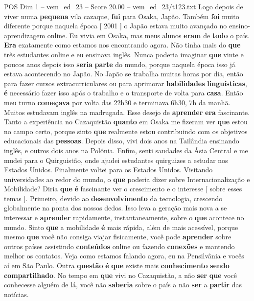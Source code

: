 \begin{textsample}{POS Dim 1 – vem\_ed\_23 – Score 20.00 – vem\_ed\_23/t123.txt}
Logo depois de viver numa \textbf{pequena} vila cazaque, \textbf{fui} para Osaka, Japão.
Também \textbf{foi} muito diferente porque naquela época [ 2001 ] o Japão estava muito avançado no ensino-aprendizagem online.
Eu vivia em Osaka, mas meus alunos \textbf{eram} de \textbf{todo} o país. \textbf{Era} exatamente como estamos nos encontrando agora.
Não tinha mais do \textbf{que} três estudantes online e eu ensinava inglês.
Nunca poderia imaginar \textbf{que} vinte e poucos anos depois isso \textbf{seria} \textbf{parte} do mundo, porque naquela época isso já estava acontecendo no Japão.
No Japão se trabalha muitas horas por dia, então para fazer cursos extracurriculares ou para aprimorar \textbf{habilidades} \textbf{linguísticas}, \textbf{é} necessário fazer isso após o trabalho e o transporte de volta para \textbf{casa}.
Então meu turno \textbf{começava} por volta das 22h30 e terminava 6h30, 7h da manhã.
Muitos estudavam inglês na madrugada.
Esse desejo de \textbf{aprender} \textbf{era} fascinante.
Tanto a experiência no Cazaquistão \textbf{quanto} em Osaka me fizeram ver \textbf{que} estou no campo certo, porque sinto \textbf{que} realmente estou contribuindo com os objetivos educacionais das \textbf{pessoas}.
Depois disso, vivi dois anos na Tailândia ensinando inglês, e outros dois anos na Polônia.
Enfim, senti saudades da Ásia Central e me mudei para o Quirguistão, onde ajudei estudantes quirguizes a estudar nos Estados Unidos.
Finalmente voltei para os Estados Unidos.
Visitando universidades ao redor do mundo, o \textbf{que} poderia dizer sobre Internacionalização e Mobilidade?
Diria \textbf{que} \textbf{é} fascinante ver o crescimento e o interesse [ sobre esses temas ].
Primeiro, devido ao \textbf{desenvolvimento} da tecnologia, crescendo globalmente na ponta dos nossos dedos.
Isso leva a geração mais nova a se interessar e \textbf{aprender} rapidamente, instantaneamente, sobre o \textbf{que} acontece no mundo.
Sinto \textbf{que} a mobilidade \textbf{é} mais rápida, além de mais acessível, porque mesmo \textbf{que} você não consiga viajar fisicamente, você pode \textbf{aprender} sobre outros países assistindo \textbf{conteúdos} online ou fazendo \textbf{conexões} e mantendo melhor os contatos.
Veja como estamos falando agora, eu na Pensilvânia e vocês aí em São Paulo.
Outra \textbf{questão} \textbf{é} \textbf{que} existe mais \textbf{conhecimento} \textbf{sendo} \textbf{compartilhado}.
No tempo em \textbf{que} vivi no Cazaquistão, a não \textbf{ser} \textbf{que} você conhecesse alguém de lá, você não \textbf{saberia} sobre o país a não \textbf{ser} a \textbf{partir} das notícias.

\end{textsample}
